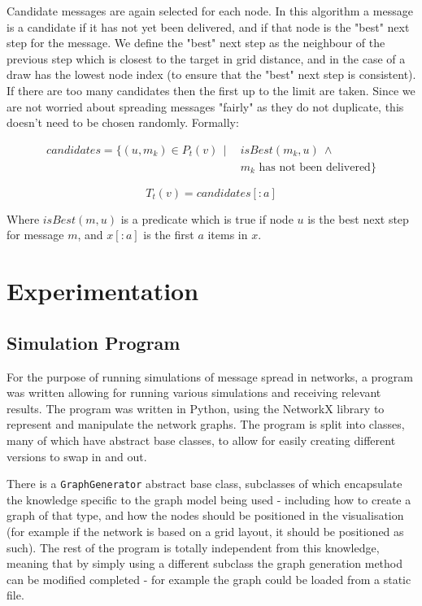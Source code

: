 \documentclass[bsc,frontabs,twoside,singlespacing,parskip,deptreport]{infthesis}     %
\begin{document}
Candidate messages are again selected for each node. In this algorithm a message is a candidate if it has not yet been delivered, and if that node is the "best" next step for the message. We define the "best" next step as the neighbour of the previous step which is closest to the target in grid distance, and in the case of a draw has the lowest node index (to ensure that the "best" next step is consistent). If there are too many candidates then the first up to the limit are taken. Since we are not worried about spreading messages "fairly" as they do not duplicate, this doesn't need to be chosen randomly. Formally:

\begin{equation}
\begin{split}
candidates = \{ (u, m_{k}) \in P_{t}(v) \:\: | \:\: & isBest(m_{k}, u) \: \wedge \\
& m_{k} \mbox{ has not been delivered} \}
\end{split}
\end{equation}

\begin{equation}
T_{t}(v) = candidates[:a]
\end{equation}

Where $isBest(m, u)$ is a predicate which is true if node $u$ is the best next step for message $m$, and $x[:a]$ is the first $a$ items in $x$.


\chapter{Experimentation}

\section{Simulation Program}
For the purpose of running simulations of message spread in networks, a program was written allowing for running various simulations and receiving relevant results. The program was written in Python, using the NetworkX library\cite{NetworkX} to represent and manipulate the network graphs. The program is split into classes, many of which have abstract base classes, to allow for easily creating different versions to swap in and out.

There is a \texttt{GraphGenerator} abstract base class, subclasses of which encapsulate the knowledge specific to the graph model being used - including how to create a graph of that type, and how the nodes should be positioned in the visualisation (for example if the network is based on a grid layout, it should be positioned as such). The rest of the program is totally independent from this knowledge, meaning that by simply using a different subclass the graph generation method can be modified completed - for example the graph could be loaded from a static file.
\end{document}
